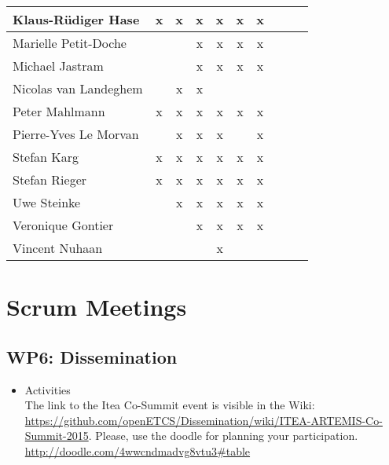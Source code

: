 \documentclass[a4paper, 11pt]{article}
\begin{document}
\begin{tabular}{|l|c|c|c||c|c|c||c|c|c|}
Klaus-R\"udiger Hase & x & x & x & x & x & x \\\hline
Marielle Petit-Doche &   &   & x & x & x & x \\\hline
Michael Jastram      &   &   & x & x & x & x \\\hline
Nicolas van Landeghem&   & x & x &   &   &   \\\hline
Peter Mahlmann       & x & x & x & x & x & x \\\hline
Pierre-Yves Le Morvan&   & x & x & x &   & x \\\hline
Stefan Karg          & x & x & x & x & x & x \\\hline
Stefan Rieger        & x & x & x & x & x & x \\\hline
Uwe Steinke          &   & x & x & x & x & x \\\hline
Veronique Gontier    &   &   & x & x & x & x \\\hline
Vincent Nuhaan       &   &   &   & x &   &   \\\hline
\end{tabular}


\section{Scrum Meetings}

\subsection{WP6: Dissemination}
\begin{itemize}
\item Activities\\
The link to the Itea Co-Summit event is visible in the Wiki:
\url{https://github.com/openETCS/Dissemination/wiki/ITEA-ARTEMIS-Co-Summit-2015}. Please, use the doodle for planning your participation.
\url{http://doodle.com/4wwcndmadvg8vtu3#table}

\end{itemize}
\end{document}
